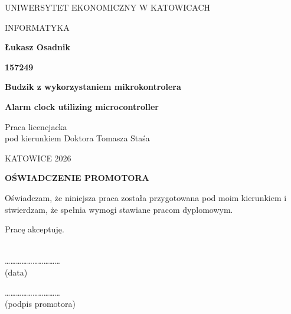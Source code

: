 
\pagestyle{empty}
\noindent
\begin{center}
    UNIWERSYTET EKONOMICZNY W KATOWICACH
\end{center}

\begin{center}
    INFORMATYKA
\end{center}

\vfill
\begin{center}
    \textbf{Łukasz Osadnik}
    \par \normalsize \textbf{157249}
\end{center}
\vfill

\begin{center}
    \Large
	\textbf{Budzik z wykorzystaniem mikrokontrolera}
\end{center}

\begin{center}
	\textbf{Alarm clock utilizing microcontroller}
\end{center}

\vfill
\vfill
\vfill

\begin{flushright}
Praca licencjacka \\
pod kierunkiem Doktora Tomasza Staśa
\end{flushright}

\vfill
\begin{center}
    KATOWICE 2026
\end{center}

\newpage 

\pagestyle{fancy}
\fancyhf{}
\fancyhf{} %
\renewcommand{\headrulewidth}{0pt}
\fancyfoot[R]{\thepage}

\begin{center}
    \textbf{OŚWIADCZENIE PROMOTORA}
\end{center}

\par \noindent Oświadczam, że niniejsza praca została przygotowana pod moim kierunkiem
i stwierdzam, że spełnia wymogi stawiane pracom dyplomowym. \\ 
\par \noindent Pracę akceptuję. \\ \\ 

\begin{minipage}{2in}
\begin{center}
\ldots\ldots\ldots\ldots\ldots\ldots\ldots\ldots\ldots\ldots{} \\
(data)
\end{center}
\end{minipage}
\hfill
\begin{minipage}{2in}
\begin{center}
\ldots\ldots\ldots\ldots\ldots\ldots\ldots\ldots\ldots\ldots{} \\
(podpis promotora)
\end{center}
\end{minipage}

